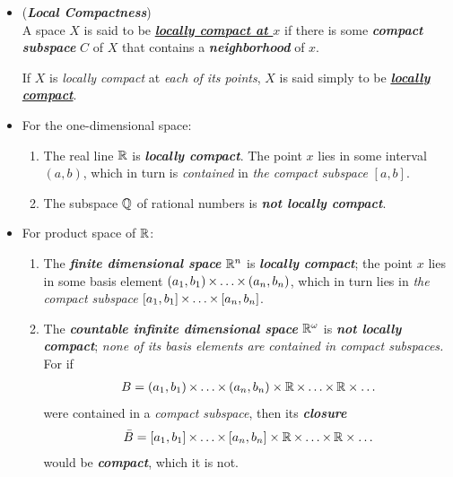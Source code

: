 \documentclass[11pt]{article}
\begin{document}
\begin{itemize} 
\item \begin{definition} (\emph{\textbf{Local Compactness}})\\
A space $X$ is said to be \underline{\emph{\textbf{locally compact at $x$}}} if there is some \emph{\textbf{compact subspace}} $C$ of $X$ that contains a \emph{\textbf{neighborhood}} of $x$. 

If $X$ is \emph{locally compact} at \emph{each of its points}, $X$ is said simply to be \underline{\emph{\textbf{locally compact}}}.
\end{definition}

\item \begin{example} 
For the one-dimensional space:
\begin{enumerate}
\item The real line ${\mathbb R}$ is \emph{\textbf{locally compact}}. The point $x$ lies in some interval $(a, b)$, which in turn is \emph{contained} in \emph{the compact subspace} $[a, b]$. 
\item The subspace ${\mathbb Q}$ of rational numbers is \emph{\textbf{not locally compact}}.
\end{enumerate}
\end{example}


\item \begin{example}
For product space of ${\mathbb R}$:
\begin{enumerate}
\item The \emph{\textbf{finite dimensional space}} ${\mathbb R}^n$ is \emph{\textbf{locally compact}}; the point $x$ lies in some basis element
$(a_1, b_1) \,{\times}\ldots{\times}\, (a_n, b_n)$, which in turn lies in \emph{the compact subspace} $[a_1, b_1] \,{\times}\ldots{\times}\, [a_n, b_n]$.
\item The \emph{\textbf{countable infinite dimensional space}} ${\mathbb R}^{\omega}$ is \emph{\textbf{not locally compact}}; \emph{none of its basis elements are contained in compact
subspaces.} For if
\begin{align*}
B = (a_1, b_1) \,{\times}\ldots{\times}\, (a_n, b_n) \times {\mathbb R} \,{\times}\ldots{\times}\, {\mathbb R} \times \ldots
\end{align*}
were contained in a \emph{compact subspace}, then its \emph{\textbf{closure}}
\begin{align*}
\bar{B} = [a_1, b_1] \,{\times}\ldots{\times}\, [a_n, b_n] \times {\mathbb R} \,{\times}\ldots{\times}\, {\mathbb R} \times \ldots
\end{align*}
would be \emph{\textbf{compact}}, which it is not.
\end{enumerate} 
\end{example}


\end{itemize}
\end{document}
